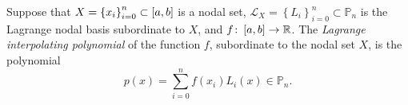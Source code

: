 \begin{frame}

    \begin{definition}
        Suppose that
        \begin{math}
            X={\left\{x_{i}\right\}}_{i=0}^{n}\subset
            \left[a,b\right]
        \end{math}
        is a nodal set,
        \begin{math}
            \mathcal{L}_{X}=
            {\left\{L_{i}\right\}}_{i=0}^{n}
            \subset
            \mathbb{P}_{n}
        \end{math}
        is the Lagrange nodal basis subordinate to $X$, and
        \begin{math}
            f\colon
            \left[a,b\right]\to
            \mathbb{R}
        \end{math}.
        The \emph{Lagrange interpolating polynomial} of the function
        $f$, subordinate to the nodal set $X$, is the polynomial
        \begin{equation*}
            p\left(x\right)=
            \sum_{i=0}^{n}
            f\left(x_{i}\right)
            L_{i}\left(x\right)\in
            \mathbb{P}_{n}.
        \end{equation*}
    \end{definition}
\end{frame}


